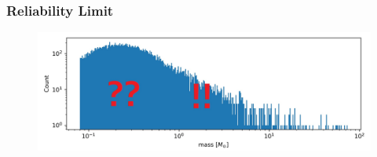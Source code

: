 \documentclass{beamer}
\begin{document}
\begin{frame}
\frametitle{Reliability Limit}
  \begin{figure}
  \includegraphics[width=\linewidth]{Images/IMF2.jpg}
  \end{figure}
\end{frame}

%


%
\end{document}
